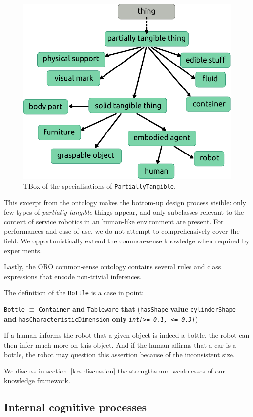 \documentclass[preprint,3p,times]{elsarticle}
\newcommand{\concept}[1]{{\small \texttt{#1}}}
\begin{document}
\begin{figure}
    \centering
    \includegraphics[width=0.6\columnwidth]{tangible_things_tbox.pdf}
    \caption{TBox of the specialisations of \concept{PartiallyTangible}.}
    \label{fig|tangible_things_tbox}
\end{figure}

This excerpt from the ontology makes the bottom-up design process visible: only
few types of \emph{partially tangible} things appear, and only subclasses
relevant to the context of service robotics in an human-like environment are
present. For performances and ease of use, we do not attempt to comprehensively
cover the field. We opportunistically extend the common-sense knowledge when
required by experiments.

Lastly, the ORO common-sense ontology contains several rules and class
expressions that encode non-trivial inferences.

The definition of the \concept{Bottle} is a case in point:

\concept{Bottle} $\equiv$ \concept{Container} {\bf and} \concept{Tableware}
{\bf that} (\concept{hasShape} {\bf value} \concept{cylinderShape} {\bf and}
\concept{hasCharacteristicDimension} {\bf only} \concept{\em int[>= 0.1, <=
0.3]})

If a human informs the robot that a given object is indeed a bottle, the robot
can then infer much more on this object. And if the human affirms that a car is
a bottle, the robot may question this assertion because of the inconsistent
size.

We discuss in section~\ref{krs-discussion} the strengths and weaknesses of our
knowledge framework.

\subsection{Internal cognitive processes}
\label{sect|intern}
\end{document}
